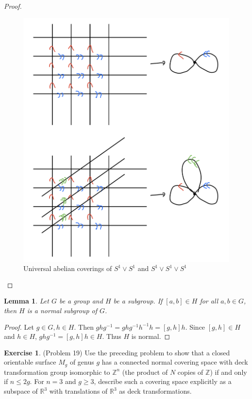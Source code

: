 \documentclass[12pt, psamsfonts]{amsart}
\newtheorem{lem}[thm]{Lemma}
\theoremstyle{definition}
\newtheorem*{exer}{Exercise}
\theoremstyle{remark}
\numberwithin{equation}{section}
\begin{document}
\begin{proof}
  \begin{figure}
    \includegraphics[width=.5\linewidth]{problem18_s1_s1.jpeg}
    \caption{Universal abelian coverings of $S^1 \vee S^1$ and $S^1 \vee S^1 \vee S^1$}
    \label{fig:problem18_s1_s1}
  \end{figure}
\end{proof}

\begin{lem}
  Let $G$ be a group and $H$ be a subgroup.
  If $[a, b] \in H$ for all $a, b \in G$, then $H$ is a normal subgroup of $G$.
\end{lem}

\begin{proof}
  Let $g \in G, h \in H$.
  Then $ghg^{-1} = ghg^{-1}h^{-1}h = [g, h]h$.
  Since $[g, h] \in H$ and $h \in H$, $ghg^{-1} = [g, h]h \in H$.
  Thus $H$ is normal.
\end{proof}

\begin{exer}{(Problem 19)}
  Use the preceding problem to show that a closed orientable surface $M_g$ of genus $g$ has a connected normal covering space with deck transformation group isomorphic to $\mathbb{Z}^n$ (the product of $N$ copies of $\mathbb{Z}$) if and only if $n \leq 2g$.
  For $n = 3$ and $g \geq 3$, describe such a covering space explicitly as a subspace of $\mathbb{R}^3$ with translations of $\mathbb{R}^3$ as deck transformations.
\end{exer}
\end{document}
